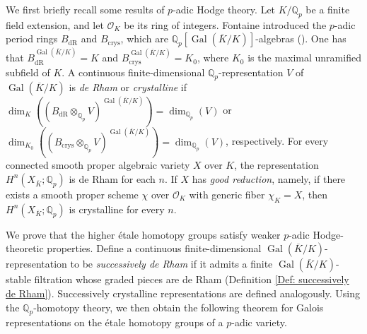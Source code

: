 \documentclass[11pt]{amsart}
\theoremstyle{definition}
\numberwithin{equation}{section}
\numberwithin{equation}{section}
\newcommand\QQ{\mathbb{Q}}
\newcommand\OO{\mathcal{O}}
\DeclareMathOperator{\dR}{dR}
\DeclareMathOperator{\crys}{crys}
\DeclareMathOperator{\Gal}{Gal}
\begin{document}
We first briefly recall some results of $p$-adic Hodge theory. Let $K/\QQ_{p}$ be a finite field extension, and let $\OO_K$ be its ring of integers. Fontaine introduced
the $p$-adic period rings $B_{\dR}$ and $B_{\crys}$, which are $\QQ_{p}[\Gal(\overline{K}/K)]$-algebras  (\cite{Fontaine-p-adic-hodge-I}\cite{Fontaine-p-adic-Hodge-II}). One has that $B_{\dR}^{\Gal(\overline{K}/K)}=K$ and $B_{\crys}^{\Gal(\overline{K}/K)}=K_0$, where $K_0$ is the maximal unramified subfield of $K$. A continuous finite-dimensional $\QQ_p$-representation $V$ of $\Gal(\overline{K}/K)$ is \textit{de Rham} or \textit{crystalline} if $\dim_K((B_{\dR}\otimes_{\QQ_p}V)^{\Gal(\overline{K}/K)})=\dim_{\QQ_p}(V)$ or $\dim_{K_0}((B_{\crys}\otimes_{\QQ_p}V)^{\Gal(\overline{K}/K)})=\dim_{\QQ_p}(V)$, respectively. For every connected smooth proper algebraic variety $X$ over $K$, the representation $H^n(X_{\overline{K}};\QQ_p)$ is de Rham for each $n$. If $X$ has \textit{good reduction}, namely, if there exists a smooth proper scheme $\chi$ over $\OO_K$ with generic fiber $\chi_{K}=X$, then $H^n(X_{\overline{K}};\QQ_p)$ is crystalline for every $n$. 

We prove that the higher \'etale homotopy groups satisfy weaker $p$-adic Hodge-theoretic properties. Define a continuous finite-dimensional $\Gal(\overline{K}/K)$-representation to be \textit{successively de Rham} if it admits a finite $\Gal(\overline{K}/K)$-stable filtration whose graded pieces are de Rham (Definition \ref{Def: successively de Rham}). Successively crystalline representations are defined analogously. Using the $\QQ_p$-homotopy theory, we then obtain the following theorem for Galois representations on the \'etale homotopy groups of a $p$-adic variety.
\end{document}
